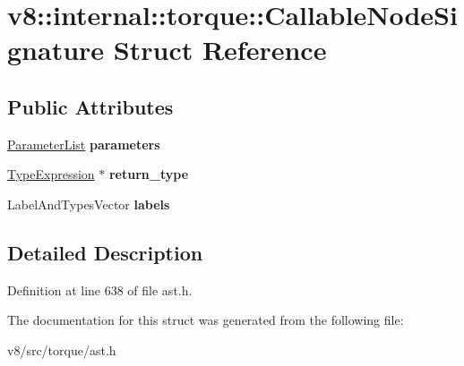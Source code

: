 \hypertarget{structv8_1_1internal_1_1torque_1_1CallableNodeSignature}{}\section{v8\+:\+:internal\+:\+:torque\+:\+:Callable\+Node\+Signature Struct Reference}
\label{structv8_1_1internal_1_1torque_1_1CallableNodeSignature}
\subsection*{Public Attributes}
\begin{DoxyCompactItemize}
\item 
\mbox{\label{structv8_1_1internal_1_1torque_1_1CallableNodeSignature_aeb1dd9380b7d8d09de6ec042072b7b0c}} 
\mbox{\hyperlink{structv8_1_1internal_1_1torque_1_1ParameterList}{Parameter\+List}} {\bfseries parameters}
\item 
\mbox{\label{structv8_1_1internal_1_1torque_1_1CallableNodeSignature_a768ec66cc56346cb742b5f7d3a784935}} 
\mbox{\hyperlink{structv8_1_1internal_1_1torque_1_1TypeExpression}{Type\+Expression}} $\ast$ {\bfseries return\+\_\+type}
\item 
\mbox{\label{structv8_1_1internal_1_1torque_1_1CallableNodeSignature_a862f00232befede69130b7afcc0b68cd}} 
Label\+And\+Types\+Vector {\bfseries labels}
\end{DoxyCompactItemize}


\subsection{Detailed Description}


Definition at line 638 of file ast.\+h.



The documentation for this struct was generated from the following file\+:\begin{DoxyCompactItemize}
\item 
v8/src/torque/ast.\+h\end{DoxyCompactItemize}
